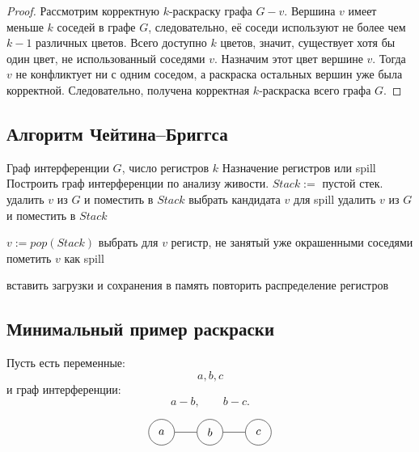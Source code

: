 \documentclass[12pt,a4paper]{article}
\begin{document}
\begin{proof}
Рассмотрим корректную $k$-раскраску графа $G-v$.
Вершина $v$ имеет меньше $k$ соседей в графе $G$, следовательно, её соседи используют не более чем $k-1$ различных цветов.
Всего доступно $k$ цветов, значит, существует хотя бы один цвет, не использованный соседями $v$.
Назначим этот цвет вершине $v$.
Тогда $v$ не конфликтует ни с одним соседом, а раскраска остальных вершин уже была корректной.
Следовательно, получена корректная $k$-раскраска всего графа $G$.
\end{proof}

\subsection{Алгоритм Чейтина--Бриггса}

\begin{algorithm}[H]
\caption{Распределение регистров через раскраску графа}
\begin{algorithmic}[1]
\Require Граф интерференции $G$, число регистров $k$
\Ensure Назначение регистров или spill
\State Построить граф интерференции по анализу живости.
\State $Stack :=$ пустой стек.
        \State удалить $v$ из $G$ и поместить в $Stack$
    \Else
        \State выбрать кандидата $v$ для spill
        \State удалить $v$ из $G$ и поместить в $Stack$
    \EndIf
\EndWhile

    \State $v := pop(Stack)$
    \State выбрать для $v$ регистр, не занятый уже окрашенными соседями
        \State пометить $v$ как spill
    \EndIf
\EndWhile

    \State вставить загрузки и сохранения в память
    \State повторить распределение регистров
\EndIf
\end{algorithmic}
\end{algorithm}

\subsection{Минимальный пример раскраски}

Пусть есть переменные:
\[
a,b,c
\]
и граф интерференции:
\[
a-b,\qquad b-c.
\]

\[
\begin{tikzpicture}[
    node distance=1.5cm,
    v/.style={draw, circle, minimum size=0.8cm}
]
\node[v] (a) {$a$};
\node[v, right of=a] (b) {$b$};
\node[v, right of=b] (c) {$c$};

\draw (a) -- (b);
\draw (b) -- (c);
\end{tikzpicture}
\]
\end{document}
